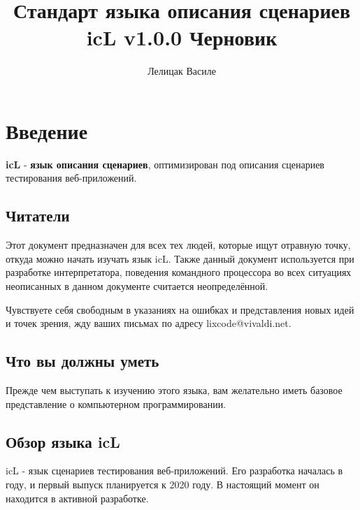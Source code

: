 \documentclass[a4paper, 14pt]{extarticle}
\begin{document}
\title{Стандарт языка описания сценариев icL v1.0.0 Черновик}
\author{Лелицак Василе}

\maketitle

\newpage
\renewcommand{\contentsname}{\textsf{Оглавление}}\makeatletter
\renewcommand{\l@section}{\@dottedtocline{1}{1.5em}{2.6em}}
\renewcommand{\l@subsection}{\@dottedtocline{2}{4.0em}{3.6em}}
\renewcommand{\l@subsubsection}{\@dottedtocline{3}{7.4em}{4.5em}}
\makeatother
\tableofcontents

\newpage
\section{Введение}

\indent \textbf{icL} - \textbf{язык описания сценариев}, оптимизирован под описания сценариев тестирования веб-приложений.

\subsection{Читатели}

Этот документ предназначен для всех тех людей, которые ищут отравную точку, откуда можно начать изучать язык icL. Также данный документ используется при разработке интерпретатора, поведения командного процессора во всех ситуациях неописанных в данном документе считается неопределённой.

Чувствуете себя свободным в указаниях на ошибках и представления новых идей и точек зрения, жду ваших письмах по адресу lixcode@vivaldi.net.

\subsection{Что вы должны уметь}

Прежде чем выступать к изучению этого языка, вам желательно иметь базовое представление о компьютерном программировании.

\subsection{Обзор языка icL}

icL - язык сценариев тестирования веб-приложений. Его разработка началась в году, и первый выпуск планируется к 2020 году. В настоящий момент он находится в активной разработке.
\end{document}
